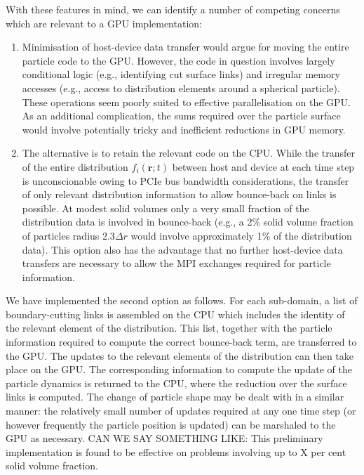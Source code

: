 With these features in mind, we can identify a number of competing
concerns which are relevant to a GPU implementation:
\begin{enumerate}
\item
Minimisation of host-device data transfer would argue for moving the
entire particle code to the GPU. However, the code in question involves
largely conditional logic (e.g., identifying cut surface links) and
irregular memory accesses (e.g., access to distribution elements around
a spherical particle). These operations seem poorly suited to effective
parallelisation on the GPU. As an additional complication, the sums
required over the particle surface would involve potentially tricky
and inefficient reductions in GPU memory.
\item
The alternative is to retain the relevant code on the CPU. While the
transfer of the entire distribution $f_i(\mathbf{r};t)$ between host
and device at each time step is unconscionable owing to PCIe bus bandwidth
considerations, the transfer of only relevant distribution information
to allow bounce-back on links is possible. At modest solid volumes
only a very small fraction of the distribution data is
involved in bounce-back (e.g., a 2\% solid volume fraction of particles
radius 2.3$\Delta r$ would involve approximately 1\% of the distribution
data). This option also has the advantage that no further host-device
data transfers are necessary to allow the MPI exchanges required for
particle information.
\end{enumerate}


We have implemented the second option as follows. For each sub-domain,
a list of boundary-cutting links is assembled on the CPU which includes
the identity of the relevant element of the distribution. This list,
together with the particle information required to compute the correct
bounce-back term, are transferred to the GPU. The updates to the relevant
elements of the distribution can then take place on the GPU. The
corresponding information to compute the update of the particle dynamics
is returned
to the CPU, where the reduction over the surface links is computed.
The change of particle shape may be dealt with in a similar manner:
the relatively small number of updates required at any one time step
(or however frequently the particle position is updated) can be
marshaled to the GPU as necessary.
CAN WE SAY SOMETHING LIKE: This preliminary implementation
is found to be effective on problems involving up to X per cent solid
volume fraction.

